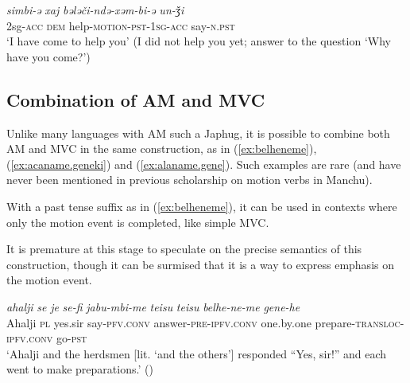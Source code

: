 \documentclass{article}
\newcommand{\ipa}[1]{\textit{{\phon\mbox{#1}}}} %
\begin{document}
\begin{exe}
\ex \label{ex:bElEcindE}
\gll 
\ipa{simbi-ə} \ipa{xaj} \ipa{bələči-ndə-xəm-bi-ə} \ipa{un-ǯi} \\
2sg-\textsc{acc} \textsc{dem} help-\textsc{motion-pst-1sg-acc} say-\textsc{n.pst} \\
\glt  `I have come to help you' (I did not help you yet; answer to the question `Why have you come?')
 \end{exe}

\subsection{Combination of AM and MVC}
Unlike many languages with AM such a Japhug, it is possible to combine both AM and MVC in the same construction, as in (\ref{ex:belheneme}), (\ref{ex:acaname.geneki}) and (\ref{ex:alaname.gene}). Such examples are rare (and have never been mentioned in previous scholarship on motion verbs in Manchu). 

With a past tense suffix as in (\ref{ex:belheneme}), it can be used in contexts where only the motion event is completed, like simple MVC. 

It is premature at this stage to speculate on the precise semantics of this construction, though it can be surmised that it is a way to express emphasis on the motion event.

\begin{exe}
\ex \label{ex:belheneme}
\gll 
\ipa{ahalji} 	\ipa{se} 	\ipa{je} 	\ipa{se-fi} 	\ipa{jabu-mbi-me} 	{\ipa{teisu} \ipa{teisu}} 	\ipa{belhe-ne-me} 	\ipa{gene-he} \\
Ahalji \textsc{pl} yes.sir say-\textsc{pfv.conv} answer-\textsc{pre-ipfv.conv} one.by.one prepare-\textsc{transloc-ipfv.conv} go-\textsc{pst} \\
\glt ‘Ahalji and the herdsmen [lit. ‘and the others’] responded “Yes, sir!” and each went to make preparations.’ (\citealt[14/45]{nowak77nisan})
\end{exe} 

\end{document}
